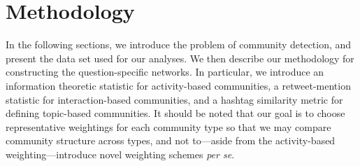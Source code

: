 \documentclass[10pt,letterpaper]{article}
\begin{document}














\section{Methodology}
In the following sections, we introduce the problem of community detection, and present the data set used for our analyses. We then describe our methodology for constructing the question-specific networks. In particular, we introduce an information theoretic statistic for activity-based communities, a retweet-mention statistic for interaction-based communities, and a hashtag similarity metric for defining topic-based communities. It should be noted that our goal is to choose representative weightings for each community type so that we may compare community structure across types, and not to---aside from the activity-based weighting---introduce novel weighting schemes \emph{per se}.
\end{document}
